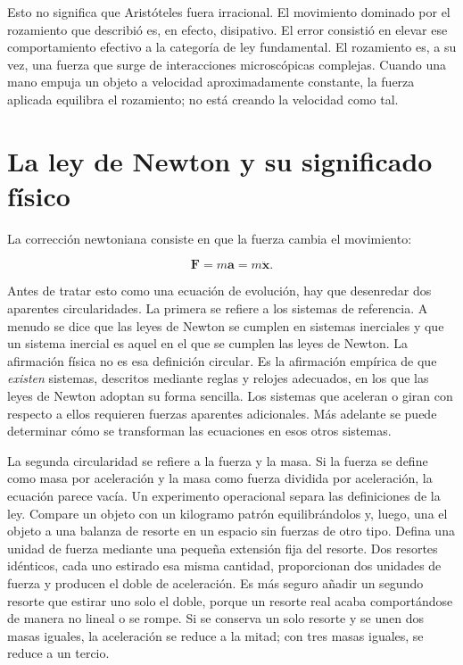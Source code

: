 Esto no significa que Aristóteles fuera irracional. El movimiento dominado por el rozamiento que describió es, en efecto, disipativo. El error consistió en elevar ese comportamiento efectivo a la categoría de ley fundamental. El rozamiento es, a su vez, una fuerza que surge de interacciones microscópicas complejas. Cuando una mano empuja un objeto a velocidad aproximadamente constante, la fuerza aplicada equilibra el rozamiento; no está creando la velocidad como tal.

\section{La ley de Newton y su significado físico}

La corrección newtoniana consiste en que la fuerza cambia el movimiento:

\begin{equation}
  \mathbf F=m\mathbf a=m\ddot{\mathbf x}.
  \label{eq:newton-second-law}
\end{equation}

Antes de tratar esto como una ecuación de evolución, hay que desenredar dos aparentes circularidades. La primera se refiere a los sistemas de referencia. A menudo se dice que las leyes de Newton se cumplen en sistemas inerciales y que un sistema inercial es aquel en el que se cumplen las leyes de Newton. La afirmación física no es esa definición circular. Es la afirmación empírica de que \emph{existen} sistemas, descritos mediante reglas y relojes adecuados, en los que las leyes de Newton adoptan su forma sencilla. Los sistemas que aceleran o giran con respecto a ellos requieren fuerzas aparentes adicionales. Más adelante se puede determinar cómo se transforman las ecuaciones en esos otros sistemas.

La segunda circularidad se refiere a la fuerza y la masa. Si la fuerza se define como masa por aceleración y la masa como fuerza dividida por aceleración, la ecuación parece vacía. Un experimento operacional separa las definiciones de la ley. Compare un objeto con un kilogramo patrón equilibrándolos y, luego, una el objeto a una balanza de resorte en un espacio sin fuerzas de otro tipo. Defina una unidad de fuerza mediante una pequeña extensión fija del resorte. Dos resortes idénticos, cada uno estirado esa misma cantidad, proporcionan dos unidades de fuerza y producen el doble de aceleración. Es más seguro añadir un segundo resorte que estirar uno solo el doble, porque un resorte real acaba comportándose de manera no lineal o se rompe. Si se conserva un solo resorte y se unen dos masas iguales, la aceleración se reduce a la mitad; con tres masas iguales, se reduce a un tercio.

